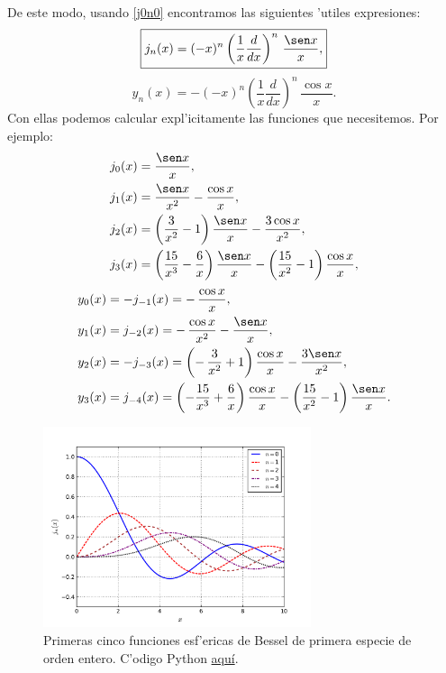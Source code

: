 De este modo, usando \eqref{j0n0} encontramos las siguientes 'utiles expresiones:
\begin{equation}
\boxed{j_n(x) = (-x)^n \left(\frac{1}{x}\frac{d}{dx}\right)^n\,\frac{\sen x}{x},}
\end{equation}
\begin{equation}
\boxed{y_n(x) = -(-x)^n \left(\frac{1}{x}\frac{d}{dx}\right)^n\,\frac{\cos x}{x}.}
\end{equation}
Con ellas podemos calcular expl'icitamente las funciones que necesitemos. Por ejemplo:
\begin{align}
j_0(x) &= \frac{\sen x}{x}, \\
j_1(x) &= \frac{\sen x} {x^2}- \frac{\cos x} {x}, \\
j_2(x) &= \left(\frac{3} {x^2} - 1 \right)\frac{\sen x}{x} - \frac{3\cos x} {x^2}, \\
j_3(x) &= \left(\frac{15}{x^3} - \frac{6}{x} \right)\frac{\sen x}{x} -\left(\frac{15}{x^2} - 1\right) \frac{\cos x} {x},
\end{align}
\begin{align}
y_0(x) &= -j_{-1}(x)=-\,\frac{\cos x} {x} ,\\
y_1(x) &= j_{-2}(x)=-\,\frac{\cos x} {x^2}- \frac{\sen x} {x}, \\
y_2(x) &=-j_{-3}(x)=\left(-\,\frac{3}{x^2}+1 \right)\frac{\cos x}{x}- \frac{3 \sen x} {x^2}, \\
y_{3}(x) &= j_{-4}(x) =\left( -\frac{15}{x^{3}}+\frac{6}{x}\right) \frac{\cos
x}{x}-\left( \frac{15}{x^{2}}-1\right) \frac{\sen x}{x}.
\end{align}
\begin{figure}[H]
\centering
\includegraphics[angle=0,width=0.7\textwidth]{figs/fig-Bessel-Esferica-j.pdf}
\caption{Primeras cinco funciones esf'ericas de Bessel de primera especie de orden entero. C'odigo Python \href{https://github.com/gfrubi/FM2/blob/master/figuras-editables/fig-Bessel.py}{aqu\'i}.}
\label{fig-jn}
\end{figure}
